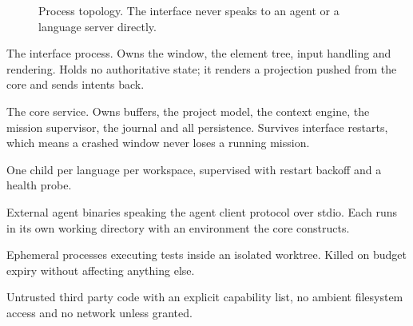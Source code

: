 \begin{figure}[h]
\centering
{}
\caption{Process topology. The interface never speaks to an agent or a language server directly.}
\end{figure}

\begin{description}[style=nextline,leftmargin=0pt]
  \item[xyra] The interface process. Owns the window, the element tree, input handling and
  rendering. Holds no authoritative state; it renders a projection pushed from the core and
  sends intents back.

  \item[xyrad] The core service. Owns buffers, the project model, the context engine, the
  mission supervisor, the journal and all persistence. Survives interface restarts, which
  means a crashed window never loses a running mission.

  \item[Language servers] One child per language per workspace, supervised with restart
  backoff and a health probe.

  \item[Agent processes] External agent binaries speaking the agent client protocol over
  stdio. Each runs in its own working directory with an environment the core constructs.

  \item[Sandbox runners] Ephemeral processes executing tests inside an isolated worktree.
  Killed on budget expiry without affecting anything else.

  \item[WASM extensions] Untrusted third party code with an explicit capability list, no
  ambient filesystem access and no network unless granted.
\end{description}

